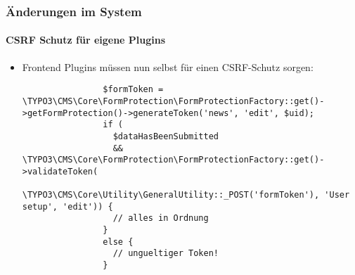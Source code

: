 
\begin{frame}[fragile]
	\frametitle{Änderungen im System}
	\framesubtitle{CSRF Schutz für eigene Plugins}

	\lstset{basicstyle=\tiny\ttfamily}

	\begin{itemize}

		\item Frontend Plugins müssen nun selbst für einen CSRF-Schutz sorgen:

			\begin{lstlisting}
				$formToken = \TYPO3\CMS\Core\FormProtection\FormProtectionFactory::get()->getFormProtection()->generateToken('news', 'edit', $uid);
				if (
				  $dataHasBeenSubmitted
				  && \TYPO3\CMS\Core\FormProtection\FormProtectionFactory::get()->validateToken(
				    \TYPO3\CMS\Core\Utility\GeneralUtility::_POST('formToken'), 'User setup', 'edit')) {
				  // alles in Ordnung
				}
				else {
				  // ungueltiger Token!
				}
			\end{lstlisting}

	\end{itemize}

\end{frame}


